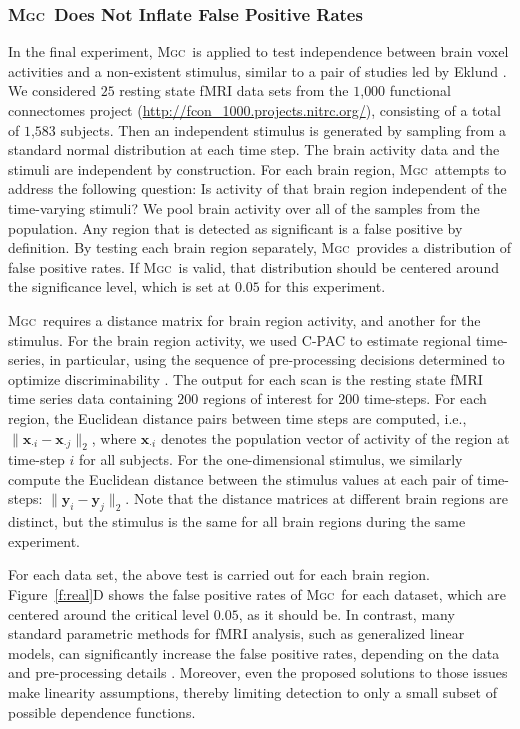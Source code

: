 \documentclass[11pt]{article}
\providecommand{\sct}[1]{{\normalfont\textsc{#1}}}
\providecommand{\mb}[1]{\boldsymbol{#1}}
\newcommand{\Mgc}{\sct{Mgc}}
\begin{document}
\subsubsection*{\Mgc~Does Not Inflate False Positive Rates} 


In the final experiment, \Mgc~is applied to test independence between brain voxel activities and a non-existent stimulus, similar to a pair of studies led by Eklund  \cite{EklundKnutsson2012,Eklund2015}. We considered $25$ resting state fMRI data sets from the $1$,$000$ functional connectomes project (\url{http://fcon_1000.projects.nitrc.org/}), consisting of a total of $1$,$583$ subjects.
Then an independent stimulus is generated by sampling from a standard normal distribution at each time step. The brain activity data and the stimuli are independent by construction.
For each brain region, \Mgc~attempts to address the following question: Is activity of that  brain region independent of the time-varying stimuli? We pool brain activity over all of the samples from the population.
Any region that is detected as significant is a false positive by definition.  By testing each brain region separately, \Mgc~provides a distribution of false positive rates.  If \Mgc~is valid, that distribution should be centered around the significance level, which is set at $0.05$ for this experiment.

\Mgc~requires a distance matrix for brain region activity, and another for the stimulus. For the brain region activity, we used C-PAC to estimate regional time-series, in particular, using the sequence of pre-processing decisions determined to optimize discriminability \cite{Wang2016}.  The output for each scan is the resting state fMRI time series data containing $200$ regions of interest for $200$ time-steps.
For each region, the Euclidean distance pairs between time steps are computed, i.e., $\|\mb{x}_{\cdot i}-\mb{x}_{\cdot j}\|_2$,  where $\mb{x}_{\cdot i}$ denotes the population vector of activity of the region at time-step $i$ for all subjects.
For the one-dimensional stimulus, we similarly compute the Euclidean distance between the stimulus values at each pair of time-steps: $\|\mb{y}_i - \mb{y}_j\|_2$.
Note that the distance matrices at different brain regions are distinct, but the stimulus is the same for all brain regions during the same experiment.


For each data set, the above test is carried out for each brain region. 
Figure~\ref{f:real}{\color{magenta}D} shows the false positive rates of  \Mgc~for each dataset, which are centered around the critical level $0.05$, as it should be.
In contrast, many standard parametric methods for fMRI analysis, such as generalized linear models, can significantly increase the false positive rates, depending on the data and pre-processing details \cite{EklundKnutsson2012,Eklund2015}. Moreover, even the proposed solutions to those issues make linearity assumptions, thereby limiting detection to only a small subset of possible dependence functions.
\end{document}
